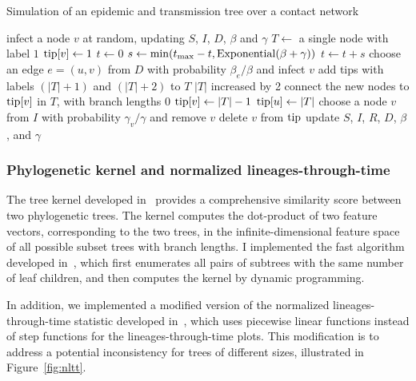\begin{algorithm}
  \label{alg:nettree}
  \caption{Simulation of an epidemic and transmission tree over a contact network}
  \begin{algorithmic}
    \State infect a node $v$ at random, updating $S$, $I$, $D$, $\beta$ and $\gamma$
    \State $T \gets$ a single node with label $1$
    \State $\mathrm{tip}[v] \gets 1$
    \State $t \gets 0$
      \State $s \gets \min(t_{\max} - t, \operatorname{Exponential}(\beta + \gamma))$
      \EndFor
      \State $t \gets t + s$
          \State choose an edge $e = (u, v)$ from $D$ with probability $\beta_e / \beta$
                 and infect $v$
          \State add tips with labels $(|T|+1)$ and $(|T|+2)$ to $T$
          \Comment $|T|$ increased by 2
          \State connect the new nodes to $\mathrm{tip}[v]$ in $T$, with branch lengths $0$
          \State $\mathrm{tip}[v] \gets |T|-1$
          \State $\mathrm{tip}[u] \gets |T|$
        \Else
          \State choose a node $v$ from $I$ with probability $\gamma_v / \gamma$
                 and remove $v$
          \State delete $v$ from $\mathrm{tip}$
        \EndIf
        \State update $S$, $I$, $R$, $D$, $\beta$, and $\gamma$
      \EndIf
    \EndWhile
  \end{algorithmic}
\end{algorithm}

\subsubsection{Phylogenetic kernel and normalized lineages-through-time}

The tree kernel developed in~\autocite{poon2013mapping} provides a
comprehensive similarity score between two phylogenetic trees. The kernel
computes the dot-product of two feature vectors, corresponding to the two
trees, in the infinite-dimensional feature space of all possible subset trees
with branch lengths. I implemented the fast algorithm developed
in~\autocite{moschitti2006making}, which first enumerates all pairs of subtrees
with the same number of leaf children, and then computes the kernel by dynamic
programming.

In addition, we implemented a modified version of the normalized
lineages-through-time statistic developed in~\autocite{janzen2015approximate},
which uses piecewise linear functions instead of step functions for the
lineages-through-time plots. This modification is to address a potential
inconsistency for trees of different sizes, illustrated in
Figure~\ref{fig:nltt}.

